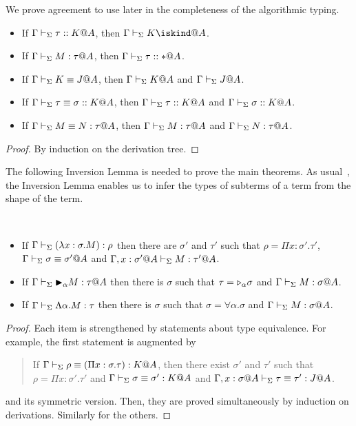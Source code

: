 We prove agreement to use later in the completeness of the algorithmic typing.

\begin{lemma}[Agreement]
    \label{lemma:Agreement}
    \begin{itemize}
        \item If \(\Gamma\vdash_\Sigma \tau::K@A\), then \(\G\V K\iskind@A \).
        \item If \(\G\V M:\tau@A\), then \(\Gamma\vdash_\Sigma \tau::*@A\).
        \item If \(\Gamma\vdash_\Sigma K\equiv J@A\), then \(\Gamma\vdash_\Sigma K @A\) and \(\Gamma\vdash_\Sigma J @A\).
        \item If \(\Gamma\vdash_\Sigma \tau\equiv \sigma :: K@A\), then \(\Gamma\vdash_\Sigma \tau::K@A\) and \(\Gamma\vdash_\Sigma \sigma::K@A\).
        \item If \(\G\V M\E N : \tau@A\), then \(\G\V M:\tau@A\) and \(\G\V N:\tau@A\).
    \end{itemize}
\end{lemma}
\begin{proof}
    By induction on the derivation tree.
\end{proof}



The following Inversion Lemma is needed to prove the main theorems.  As
usual~\cite{TAPL}, the Inversion Lemma enables us to infer the types of
subterms of a term from the shape of the term.

\begin{lemma}[Inversion]\ 
	\begin{itemize}
		\item If $\Gamma \vdash_\Sigma (\lambda x:\sigma.M) : \rho$ then there are $\sigma'$ and $\tau'$ such that
		      $\rho = \Pi x:\sigma'.\tau'$, $\Gamma \vdash_\Sigma \sigma \equiv \sigma'@A$ and $\Gamma ,x:\sigma'@A\vdash_\Sigma M:\tau'@A$.
		\item If $\G \V \TB_\alpha M : \tau@A$ then 
		      there is $\sigma$ such that $\tau = {\mathop{\triangleright}}_\alpha \sigma$ and $\G \V M : \sigma@A$.
		  \item If $\Gamma \vdash_\Sigma \Lambda\alpha.M : \tau$ then 
		  there is $\sigma$ such that $\sigma = \forall\alpha.\sigma$ and $\G \V M : \sigma@A$.%
	\end{itemize}
\end{lemma}

\begin{proof}
  Each item is strengthened by statements about type equivalence.
  For example, the first statement is augmented by
  \begin{quotation}
    If $\Gamma \vdash_\Sigma \rho \equiv (\Pi x:\sigma.\tau) : K @A$, then there exist
    $\sigma'$ and $\tau'$ such that $\rho = \Pi x:\sigma'.\tau'$ and
    $\Gamma \vdash_\Sigma \sigma \equiv \sigma' : K @A$ and
    $\G, x:\sigma@A\V \tau \E \tau' : J @A$.
  \end{quotation}
  and its symmetric version.  Then, they are proved simultaneously by induction on derivations.
  Similarly for the others.
\end{proof}

